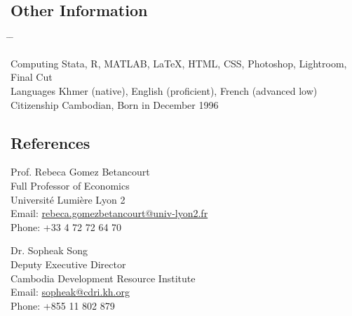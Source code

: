 \documentclass[10pt,a4paper]{article}
\newcommand{\tabbedblock}[1]{

	\begin{tabbing}
		\hspace{2cm} \= \hspace{4cm} \= \kill
		#1
	\end{tabbing}
}
\begin{document}


\subsection*{Other Information}

\tabbedblock{
	Computing \> Stata, R, MATLAB, \LaTeX, HTML, CSS, Photoshop, Lightroom, Final Cut\\
	
	Languages \> Khmer (native), English (proficient), French (advanced low)\\
	
	Citizenship \> Cambodian, Born in December 1996
}


\subsection*{References}		

\parbox{0.5\textwidth}{ %
	Prof. Rebeca Gomez Betancourt\\ 
	Full Professor of Economics\\ 
	Université Lumière Lyon 2\\
	Email: \href{mailto: Phone: rebeca.gomezbetancourt@univ-lyon2.fr}{rebeca.gomezbetancourt@univ-lyon2.fr}\\
	Phone: +33 4 72 72 64 70
}
\hfill %
\parbox{0.5\textwidth}{ %
	Dr. Sopheak Song\\ 
	Deputy Executive Director \\
	Cambodia Development Resource Institute\\ 
	Email: \href{mailto: sopheak@cdri.kh.org}{sopheak@cdri.kh.org}\\
	Phone: +855 11 802 879
}

\vspace{1.5em}
\end{document}
